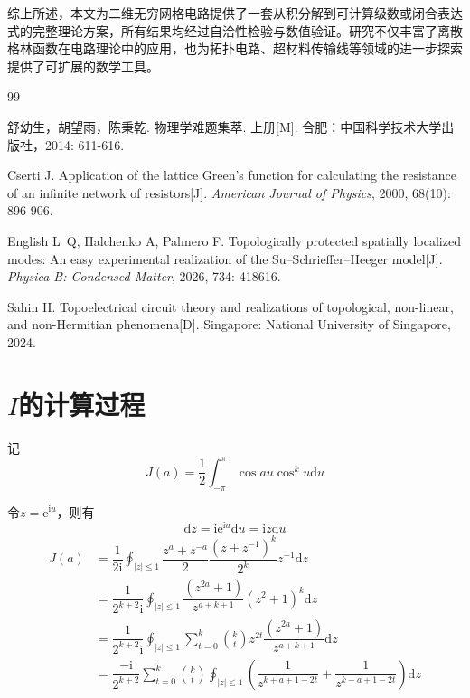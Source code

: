 \documentclass{article} %
\newcommand{\di}{\mathrm{d}}
\newcommand{\ii}{\mathrm{i}}
\newcommand{\e}[1]{\mathrm{e}^{#1}}
\begin{document}
综上所述，本文为二维无穷网格电路提供了一套从积分解到可计算级数或闭合表达式的完整理论方案，所有结果均经过自洽性检验与数值验证。研究不仅丰富了离散格林函数在电路理论中的应用，也为拓扑电路、超材料传输线等领域的进一步探索提供了可扩展的数学工具。


\begin{thebibliography}{99}

舒幼生，胡望雨，陈秉乾.
物理学难题集萃. 上册[M].
合肥：中国科学技术大学出版社，2014: 611-616.

Cserti J.
Application of the lattice Green's function for calculating the resistance of an infinite network of resistors[J].
\textit{American Journal of Physics}, 2000, 68(10): 896-906.

English L~Q, Halchenko A, Palmero F.
Topologically protected spatially localized modes: An easy experimental realization of the Su–Schrieffer–Heeger model[J].
\textit{Physica B: Condensed Matter}, 2026, 734: 418616.

Sahin H.
Topoelectrical circuit theory and realizations of topological, non-linear, and non-Hermitian phenomena[D].
Singapore: National University of Singapore, 2024.


\end{thebibliography}



\clearpage
\appendix
\section{$I$的计算过程}\label{A}
记
\begin{equation}
  J(a)=\dfrac{1}{2}\int_{-\pi}^\pi\cos au\cos^ku\di u
\end{equation}

令$z=\e{\ii u}$，则有
\begin{equation}
  \di z=\ii\e{\ii u}\di u=\ii z\di u
\end{equation}
\begin{align*}
  J(a)&=\dfrac{1}{2\ii}\oint_{|z|\leqslant1}\dfrac{z^a+z^{-a}}{2}\dfrac{\left(z+z^{-1}\right)^k}{2^k}z^{-1}\di z\\
  &=\dfrac{1}{2^{k+2}\ii}\oint_{|z|\leqslant1}\dfrac{\left(z^{2a}+1\right)}{z^{a+k+1}}\left(z^2+1\right)^k\di z\\
  &=\dfrac{1}{2^{k+2}\ii}\oint_{|z|\leqslant1}\sum_{t=0}^{k}\binom{k}{t}z^{2t}\dfrac{\left(z^{2a}+1\right)}{z^{a+k+1}}\di z\\
  &=\dfrac{-\ii}{2^{k+2}}\sum_{t=0}^{k}\binom{k}{t}\oint_{|z|\leqslant1}\left(\dfrac{1}{z^{k+a+1-2t}}+\dfrac{1}{z^{k-a+1-2t}}\right)\di z\\
\end{align*}
\end{document}
